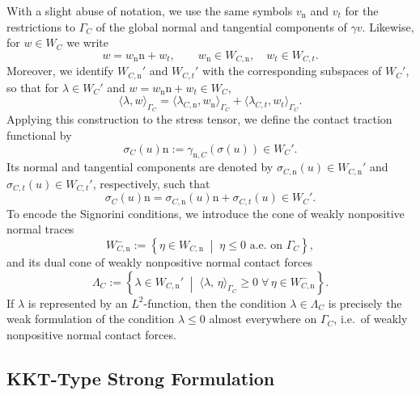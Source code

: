 With a slight abuse of notation, we use the same symbols $v_{\mathrm n}$ and $v_t$ for the restrictions to $\Gamma_C$ of the global normal and tangential components of $\gamma v$. Likewise, for $w \in W_C$ we write
\begin{equation*}
	w = w_{\mathrm n}\mathrm n + w_t,
	\qquad
	w_{\mathrm n} \in W_{C,\mathrm n}, \quad w_t \in W_{C,t}.
\end{equation*}
Moreover, we identify $W_{C,\mathrm n}'$ and $W_{C,t}'$ with the corresponding subspaces of $W_C'$, so that for $\lambda \in W_C'$ and $w = w_{\mathrm n}\mathrm n + w_t \in W_C$,
\begin{equation*}
	\langle \lambda, w \rangle_{\Gamma_C}
	=
	\langle \lambda_{C,\mathrm n}, w_{\mathrm n} \rangle_{\Gamma_C}
	+
	\langle \lambda_{C,t}, w_t \rangle_{\Gamma_C}.
\end{equation*}
Applying this construction to the stress tensor, we define the contact traction functional by
\begin{equation*}
	\sigma_C(u)\mathrm{n}
	:=
	\gamma_{\mathrm n,C}(\sigma(u))\in W_C'.
\end{equation*}
Its normal and tangential components are denoted by $\sigma_{C,\mathrm n}(u)\in W_{C,\mathrm n}'$ and $\sigma_{C,t}(u)\in W_{C,t}'$, respectively, such that
\begin{equation}\label{eq:sigmadecomp}
	\sigma_C(u)\mathrm{n} = \sigma_{C,\mathrm n}(u)\mathrm{n}+\sigma_{C,t}(u)\in W_C'.
\end{equation}
To encode the Signorini conditions, we introduce the cone of weakly nonpositive normal traces
\begin{equation*}
	W_{C,\mathrm n}^-
	:=
	\left\{
	\eta\in W_{C,\mathrm n}
	\;\middle|\;
	\eta\le 0 \text{ a.e.\ on }\Gamma_C
	\right\},
\end{equation*}
and its dual cone of weakly nonpositive normal contact forces
\begin{equation*}
	\Lambda_C
	:=
	\left\{
	\lambda\in W_{C,\mathrm n}'
	\;\middle|\;
	\langle \lambda,\,\eta\rangle_{\Gamma_C}\ge 0
	\;
	\forall\,\eta\in W_{C,\mathrm n}^-
	\right\}.
\end{equation*}
If $\lambda$ is represented by an $L^2$-function, then the condition $\lambda\in\Lambda_C$ is precisely the weak formulation of the condition $\lambda\le 0$ almost everywhere on $\Gamma_C$, i.e.\ of weakly nonpositive normal contact forces.

\subsection{KKT-Type Strong Formulation}

